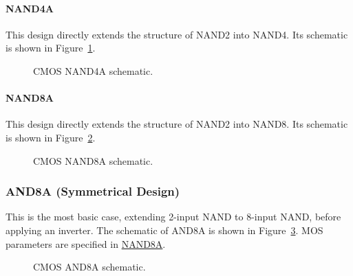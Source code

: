 \documentclass{scrartcl}
\begin{document}
        \paragraph{NAND4A}\label{s:nand4a}
        This design directly extends the structure of NAND2 into NAND4.
        Its schematic is shown in Figure~\ref{fig:nand4}.
        \begin{figure}[htbp]
          \centering
          
          \caption{CMOS NAND4A schematic.}
          \label{fig:nand4}
        \end{figure}

        \newpage

        \paragraph{NAND8A}\label{s:nand8a}
        This design directly extends the structure of NAND2 into NAND8.
        Its schematic is shown in Figure~\ref{fig:nand8}.
        \begin{figure}[htbp]
          \centering
          
          \caption{CMOS NAND8A schematic.}
          \label{fig:nand8}
        \end{figure}

      \newpage
      \subsubsection{AND8A (Symmetrical Design)}\label{s:and8a}

        This is the most basic case, extending 2-input NAND to 8-input NAND,
        before applying an inverter.
        The schematic of AND8A is shown in Figure~\ref{fig:and8a}.
        MOS parameters are specified in \hyperref[s:nand8a]{NAND8A}.
        \begin{figure}[htbp]
          \centering
          
          \caption{CMOS AND8A schematic.}
          \label{fig:and8a}
        \end{figure}
\end{document}
